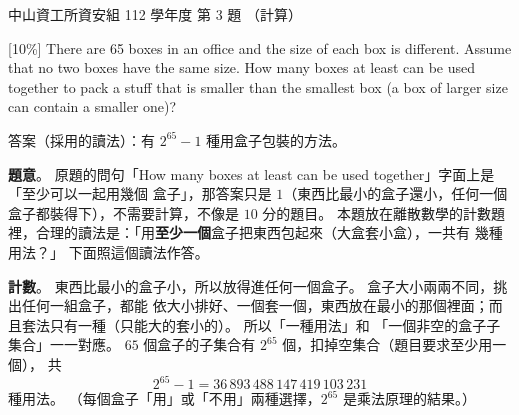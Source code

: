 \begin{pastexam}[label={px:nsysu-112-dmalg-03}]{中山資工所資安組 112 學年度 第 3 題}
（計算）

{[10\%]} There are 65 boxes in an office and the size of each box is different. Assume that no two boxes
have the same size. How many boxes at least can be used together to pack a stuff that is smaller than the
smallest box (a box of larger size can contain a smaller one)?
\end{pastexam}

\begin{pastsoln}
答案（採用的讀法）：有 $2^{65} - 1$ 種用盒子包裝的方法。

\textbf{題意}。 原題的問句「How many boxes at least can be used together」字面上是「至少可以一起用幾個
盒子」，那答案只是 $1$（東西比最小的盒子還小，任何一個盒子都裝得下），不需要計算，不像是 $10$ 分的題目。
本題放在離散數學的計數題裡，合理的讀法是：「用\textbf{至少一個}盒子把東西包起來（大盒套小盒），一共有
幾種用法？」 下面照這個讀法作答。

\textbf{計數}。 東西比最小的盒子小，所以放得進任何一個盒子。 盒子大小兩兩不同，挑出任何一組盒子，都能
依大小排好、一個套一個，東西放在最小的那個裡面；而且套法只有一種（只能大的套小的）。 所以「一種用法」和
「一個非空的盒子子集合」一一對應。 $65$ 個盒子的子集合有 $2^{65}$ 個，扣掉空集合（題目要求至少用一個），
共
\[
2^{65} - 1 = 36\,893\,488\,147\,419\,103\,231
\]
種用法。 （每個盒子「用」或「不用」兩種選擇，$2^{65}$ 是乘法原理的結果。）
\end{pastsoln}
